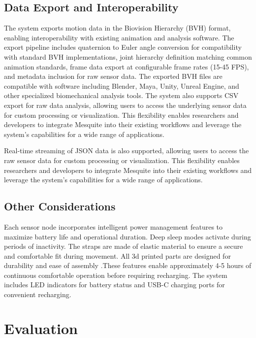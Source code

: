 \documentclass[lettersize,journal]{IEEEtran}
\begin{document}
\subsection{ Data Export and Interoperability}
The system exports motion data in the Biovision Hierarchy (BVH) format, enabling interoperability with existing animation and analysis software. The export pipeline includes quaternion to Euler angle conversion for compatibility with standard BVH implementations, joint hierarchy definition matching common animation standards, frame data export at configurable frame rates (15-45 FPS), and metadata inclusion for raw sensor data. The exported BVH files are compatible with software including Blender\cite{blender}, Maya\cite{maya}, Unity\cite{unity}, Unreal Engine\cite{unreal}, and other specialized biomechanical analysis tools. The system also supports CSV export for raw data analysis, allowing users to access the underlying sensor data for custom processing or visualization. This flexibility enables researchers and developers to integrate Mesquite into their existing workflows and leverage the system's capabilities for a wide range of applications.

Real-time streaming of JSON data is also supported, allowing users to access the raw sensor data for custom processing or visualization. This flexibility enables researchers and developers to integrate Mesquite into their existing workflows and leverage the system's capabilities for a wide range of applications.


\subsection{Other Considerations}

Each sensor node incorporates intelligent power management features to maximize battery life and operational duration. Deep sleep modes activate during periods of inactivity. The straps are made of elastic material to ensure a secure and comfortable fit during movement. All 3d printed parts are designed for durability and ease of assembly .These features enable approximately 4-5 hours of continuous comfortable operation before requiring recharging. The system includes LED indicators for battery status and USB-C charging ports for convenient recharging.

\section{Evaluation}
\end{document}

